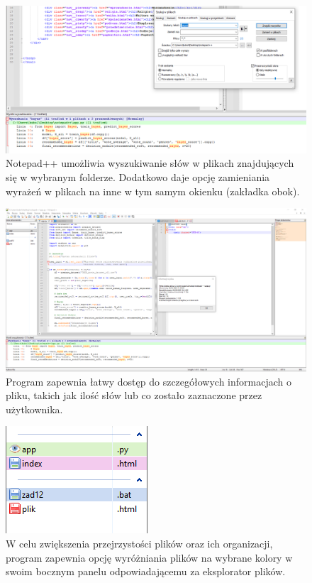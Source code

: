 \documentclass[0.82pt,a4paper]{article}
\begin{document}
    \begin{figure}[H]
        \centering
        \includegraphics[width=0.8\linewidth]{media/Notepad/notepad4.png}
        \caption[notepad wyszukiwanie]{Notepad++ umożliwia wyszukiwanie słów w plikach znajdujących się w wybranym folderze. Dodatkowo daje opcję zamieniania wyrażeń w plikach na inne w tym samym okienku (zakładka obok).}
        \label{fig:notepad_wyszukiwanie}
    \end{figure}

    \begin{figure}[H]
        \centering
        \includegraphics[width=0.8\linewidth]{media/Notepad/notepad5.PNG}
        \caption[notepad info]{Program zapewnia łatwy dostęp do szczegółowych informacjach o pliku, takich jak ilość słów lub co zostało zaznaczone przez użytkownika.}
        \label{fig:notepad_info}
    \end{figure}

    \begin{figure}[H]
        \centering
        \includegraphics[width=0.8\linewidth]{media/Notepad/notepad6.PNG}
        \caption[notepad kolory]{W celu zwiększenia przejrzystości plików oraz ich organizacji, program zapewnia opcję wyróżniania plików na wybrane kolory w swoim bocznym panelu odpowiadającemu za eksplorator plików.}
        \label{fig:notepad_kolory}
    \end{figure}
\end{document}
